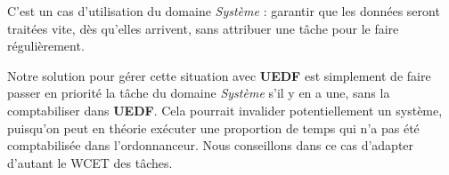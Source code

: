 	C'est un cas d'utilisation du domaine \textit{Système} : garantir que les données seront traitées vite, dès qu'elles arrivent, 
	sans attribuer une tâche pour le faire régulièrement.\newline
	
	Notre solution pour gérer cette situation avec \textbf{UEDF} est simplement de faire passer en priorité 
	la tâche du domaine \textit{Système} s'il y en a une, sans la comptabiliser dans \textbf{UEDF}. 
	Cela pourrait invalider potentiellement un système, puisqu'on peut en théorie 
	exécuter une proportion de temps qui n'a pas été comptabilisée dans l'ordonnanceur. 
	Nous conseillons dans ce cas d'adapter d'autant le WCET des tâches.
